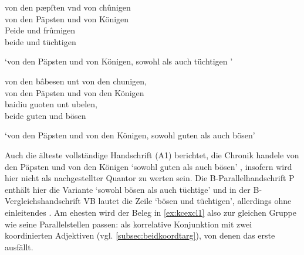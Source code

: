 \begin{exe}
\ex \begin{xlist}
	\ex \label{ex:kcexcl1}
		\gll von den pæpſten vnd von chûnigen \\
			von den Päpsten und von Königen \\
	\sn \gll Peide und frûmigen \\
			beide und tüchtigen \\
		\begin{taggedline}{\parencite[\pno~2\va, 20--21]{kc:B1}}
		\trans `von den Päpsten und von Königen, sowohl als auch tüchtigen
			'
		\end{taggedline}

	\ex \label{ex:kcexcl1_schroeder}
		\gll von den bâbesen unt von den chunigen, \\
			von den Päpsten und von den Königen \\
	\sn \gll baidiu guoten unt ubelen, \\
			beide guten und bösen \\
		\begin{taggedline}{\parencite[19--20]{schroeder1895}}
		\trans `von den Päpsten und von den Königen, sowohl guten als auch
			bösen'
		\end{taggedline}
\end{xlist}
\end{exe}

Auch die älteste vollständige Handschrift (A1) berichtet, die
Chronik handele von den Päpsten und von den Königen 
`sowohl guten als auch bösen' \autocites[1\ra,
18]{kc:A1}[vgl.][20]{schroeder1895}, insofern wird  hier nicht als
nachgestellter Quantor zu werten sein. Die
B-\allowbreak{}Pa\-ral\-lel\-hand\-schrift P enthält hier die
Variante  `sowohl bösen als auch
tüchtige' \autocite[\pno~1\ra, 10]{kc:P} und in der
B-Vergleichshandschrift VB lautet die Zeile  `bösen und tüchtigen', allerdings ohne einleitendes
 \autocite[\pno~1\ra, 18]{kc:VB}. Am ehesten wird der Beleg in \cref{ex:kcexcl1} also
zur gleichen Gruppe wie seine Parallelstellen passen:  als
korrelative Konjunktion mit zwei koordinierten Adjektiven (vgl.
\cref{subsec:beidkoordtarg}), von denen das erste ausfällt.

